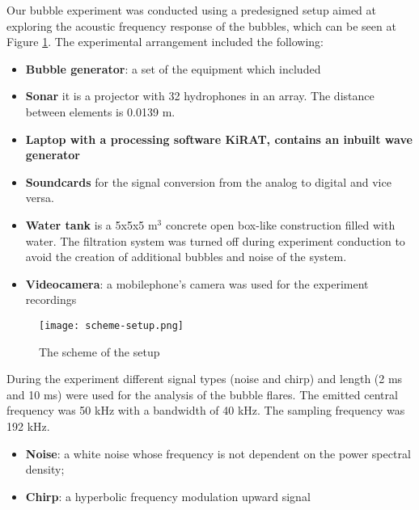Our bubble experiment was conducted using a predesigned setup aimed at exploring the acoustic frequency response of the bubbles, which can be seen at Figure \ref*{fig:scheme-setup}. The experimental arrangement included the following:
\begin{itemize}
    \item \textbf{Bubble generator}: a set of the equipment which included
    \item \textbf{Sonar} it is a projector with 32 hydrophones in an array. The distance between elements is 0.0139 m.
    \item \textbf{Laptop with a processing software KiRAT, contains an inbuilt wave generator}
    \item \textbf{Soundcards} for the signal conversion from the analog to digital and vice versa.
    \item \textbf{Water tank} is a 5x5x5 m$^3$ concrete open box-like construction filled with water. The filtration system was turned off during experiment conduction to avoid the creation of additional bubbles and noise of the system.
    \item \textbf{Videocamera}: a mobilephone's camera was used for the experiment recordings
\end{itemize}

\begin{figure}[H]
    \centering
    \texttt{[image: scheme-setup.png]}
    \caption{The scheme of the setup}
    \label{fig:scheme-setup}
\end{figure}


During the experiment different signal types (noise and chirp) and length (2 ms and 10 ms) were used for the analysis of the bubble flares. The emitted central frequency was 50 kHz with a bandwidth of 40 kHz. The sampling frequency was 192 kHz.
\begin{itemize}
    \item \textbf{Noise}: a white noise whose frequency is not dependent on the power spectral density\cite*{ainslie_principles_2010};  
    \item \textbf{Chirp}: a hyperbolic frequency modulation upward signal 
\end{itemize}

